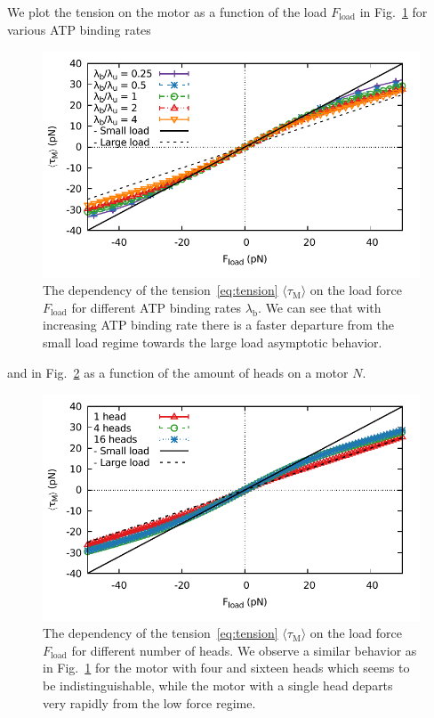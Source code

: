 \documentclass[aps,pre,twocolumn,showpacs,showkeys,superscriptaddress,floatfix]{revtex4-1}
\begin{document}
We plot the tension on the motor as a function of the load $F_\text{load}$ in Fig.~\ref{fig:tension} for various ATP binding rates 
\begin{figure}
\centering
\includegraphics[width=.9\linewidth,height=!]{tension.pdf}
\caption{\label{fig:tension}
The dependency of the tension~\eqref{eq:tension} $\langle \tau_\text{M}\rangle$ on the load force $F_\text{load}$ for different ATP binding rates $\lambda_\text{b}$.
We can see that with increasing ATP binding rate there is a faster departure from the small load regime towards the large load asymptotic behavior. 
}
\end{figure}
and in Fig.~\ref{fig:tension_heads} as a function of the amount of heads on a motor $N$. 
\begin{figure}
\centering
\includegraphics[width=.9\linewidth,height=!]{tension_heads.pdf}
\caption{\label{fig:tension_heads}
The dependency of the tension~\eqref{eq:tension} $\langle \tau_\text{M}\rangle$ on the load force $F_\text{load}$ for different number of heads. 
We observe a similar behavior as in Fig.~\ref{fig:tension} for the motor with four and sixteen heads which seems to be indistinguishable, 
while the motor with a single head departs very rapidly from the low force regime. 
}
\end{figure}
\end{document}
